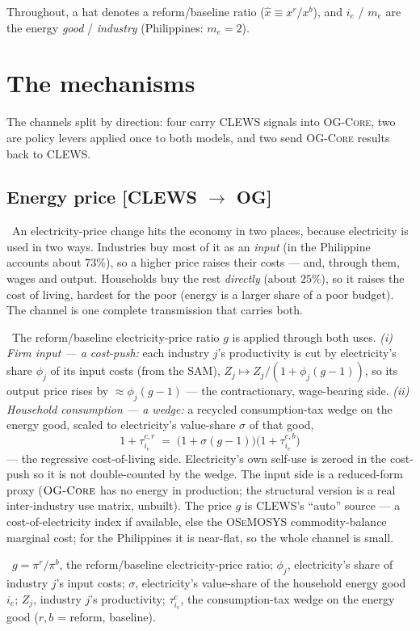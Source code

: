 \documentclass[11pt]{article}
\newcommand{\OGCore}{\textsc{OG-Core}}
\newcommand{\CLEWS}{\textsc{CLEWS}}
\newcommand{\OSeMOSYS}{\textsc{OSeMOSYS}}
\newcommand{\dir}[1]{\nolinebreak\hfill{\normalfont\small\color{mute}[#1]}}
\newcommand{\Intuition}{\par\smallskip\noindent{\color{ogc}\bfseries Intuition.}\ }
\newcommand{\Technical}{\par\smallskip\noindent{\color{clews}\bfseries Technical.}\ }
\newcommand{\Variables}{\par\smallskip\noindent{\color{sub}\bfseries Variables.}\ }
\begin{document}
Throughout, a hat denotes a reform/baseline ratio ($\hat x \equiv x^{r}/x^{b}$), and
$i_e$ / $m_e$ are the energy \emph{good} / \emph{industry} (Philippines: $m_e=2$).

\section{The mechanisms}

The channels split by direction: four carry \CLEWS{} signals into \OGCore{}, two are
policy levers applied once to both models, and two send \OGCore{} results back to
\CLEWS{}.

\subsection{Energy price \dir{CLEWS $\to$ OG}}
\Intuition An electricity-price change hits the economy in two places, because
electricity is used in two ways. Industries buy most of it as an \emph{input} (in the
Philippine accounts about $73\%$), so a higher price raises their costs --- and, through
them, wages and output. Households buy the rest \emph{directly} (about $25\%$), so it
raises the cost of living, hardest for the poor (energy is a larger share of a poor
budget). The channel is one complete transmission that carries both.
\Technical The reform/baseline electricity-price ratio $g$ is applied through both uses.
\emph{(i) Firm input --- a cost-push:} each industry $j$'s productivity is cut by
electricity's share $\phi_j$ of its input costs (from the SAM),
$Z_j \mapsto Z_j/(1+\phi_j(g-1))$, so its output price rises by $\approx\phi_j(g-1)$ ---
the contractionary, wage-bearing side. \emph{(ii) Household consumption --- a wedge:} a
recycled consumption-tax wedge on the energy good, scaled to electricity's value-share
$\sigma$ of that good,
\[
  1+\tau^{c,r}_{i_e} \;=\; \bigl(1+\sigma(g-1)\bigr)\bigl(1+\tau^{c,b}_{i_e}\bigr)
\]
--- the regressive cost-of-living side. Electricity's own self-use is zeroed in the
cost-push so it is not double-counted by the wedge. The input side is a reduced-form
proxy ($\OGCore{}$ has no energy in production; the structural version is a real
inter-industry use matrix, unbuilt). The price $g$ is \CLEWS{}'s ``auto'' source --- a
cost-of-electricity index if available, else the \OSeMOSYS{} commodity-balance marginal cost; for
the Philippines it is near-flat, so the whole channel is small.
\Variables $g=\pi^{r}/\pi^{b}$, the reform/baseline electricity-price ratio; $\phi_j$,
electricity's share of industry $j$'s input costs; $\sigma$, electricity's value-share of
the household energy good $i_e$; $Z_j$, industry $j$'s productivity; $\tau^{c}_{i_e}$, the
consumption-tax wedge on the energy good ($r,b$ = reform, baseline).
\end{document}
